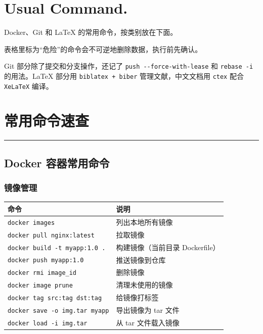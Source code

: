\section{Usual Command.}

Docker、Git 和 LaTeX 的常用命令，按类别放在下面。

表格里标为“危险”的命令会不可逆地删除数据，执行前先确认。

Git 部分除了提交和分支操作，还记了 \verb|push --force-with-lease| 和 \verb|rebase -i| 的用法。LaTeX 部分用 \verb|biblatex + biber| 管理文献，中文文档用 \verb|ctex| 配合 \verb|XeLaTeX| 编译。

\section{常用命令速查}

\hrule

\subsection{Docker 容器常用命令}

\subsubsection{镜像管理}

\begin{center}
\begin{tabular}{ll}
\toprule
命令 & 说明 \\
\midrule
\verb|docker images| & 列出本地所有镜像 \\
\verb|docker pull nginx:latest| & 拉取镜像 \\
\verb|docker build -t myapp:1.0 .| & 构建镜像（当前目录 Dockerfile） \\
\verb|docker push myapp:1.0| & 推送镜像到仓库 \\
\verb|docker rmi image_id| & 删除镜像 \\
\verb|docker image prune| & 清理未使用的镜像 \\
\verb|docker tag src:tag dst:tag| & 给镜像打标签 \\
\verb|docker save -o img.tar myapp| & 导出镜像为 tar 文件 \\
\verb|docker load -i img.tar| & 从 tar 文件载入镜像 \\
\bottomrule
\end{tabular}
\end{center}

